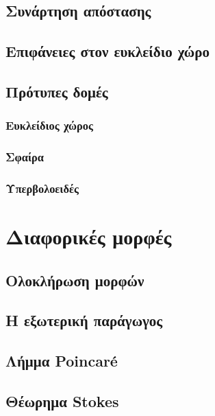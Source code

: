\documentclass[11pt,a4paper,twoside,openright]{book}
\begin{document}
\section{Συνάρτηση απόστασης}
	\label{sec:distance-function}
	
\section{Επιφάνειες στον ευκλείδιο χώρο}
	\label{sec:surfaces-in-euclidean-space}

\section{Πρότυπες δομές}
	\label{sec:model-structures}

\subsection{Ευκλείδιος χώρος}

\subsection{Σφαίρα}

\subsection{Υπερβολοειδές}
	
\chapter{Διαφορικές μορφές}
	\label{chapter:differential-forms}

\section{Ολοκλήρωση μορφών}
	\label{sec:integration}	
	
\section{Η εξωτερική παράγωγος}
	\label{sec:exterior-derivative}
	
\section{Λήμμα Poincaré}
	\label{sec:poincare-lemma}
	
\section{Θέωρημα Stokes}
	\label{sec:stokes-theorem}
	
\end{document}
